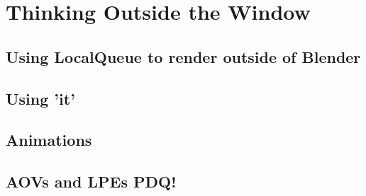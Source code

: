 \chapter{Thinking Outside the Window}
\section{Using LocalQueue to render outside of Blender}
\section{Using 'it'}
\section{Animations}
\section{AOVs and LPEs PDQ!}
